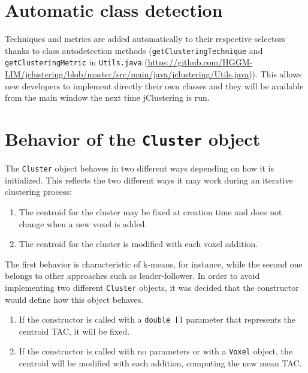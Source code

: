 \documentclass[11pt]{article} %
\begin{document}
\section{Automatic class detection}
\label{sec:automatic_class}

Techniques and metrics are added automatically to their respective selectors thanks to class autodetection methods ({\tt getClusteringTechnique} and {\tt getClusteringMetric} in {\tt Utils.java} (\url{https://github.com/HGGM-LIM/jclustering/blob/master/src/main/java/jclustering/Utils.java})). This allows new developers to implement directly their own classes and they will be available from the main window the next time jClustering is run.

\section{Behavior of the {\tt Cluster} object}
\label{sec:cluster_behavior}

The {\tt Cluster} object behaves in two different ways depending on how it is initialized. This reflects the two different ways it may work during an iterative clustering process:

\begin{enumerate}
\item The centroid for the cluster may be fixed at creation time and does not change when a new voxel is added.
\item The centroid for the cluster is modified with each voxel addition.
\end{enumerate}

The first behavior is characteristic of k-means, for instance, while the second one belongs to other approaches such as leader-follower. In order to avoid implementing two different {\tt Cluster} objects, it was decided that the constructor would define how this object behaves.

\begin{enumerate}
\item If the constructor is called with a {\tt double []} parameter that represents the centroid TAC, it will be fixed.
\item If the constructor is called with no parameters or with a {\tt Voxel} object, the centroid will be modified with each addition, computing the new mean TAC.
\end{enumerate}
\end{document}
